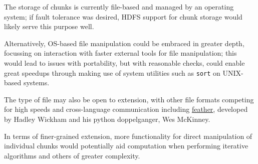 \documentclass[10pt,a4paper]{article}
\begin{document}
The storage of chunks is currently file-based and managed by an
operating system; if fault tolerance was desired, HDFS support for
chunk storage would likely serve this purpose well.

Alternatively, OS-based file manipulation could be embraced in greater
depth, focussing on interaction with faster external tools for file
manipulation; this would lead to issues with portability, but with
reasonable checks, could enable great speedups through making use of
system utilities such as \texttt{sort} on UNIX-based systems.

The type of file may also be open to extension, with other file
formats competing for high speeds and cross-language communication
including \href{https://github.com/wesm/feather}{feather}, developed
by Hadley Wickham and his python doppelganger, Wes
McKinney\cite{wes16}.


In terms of finer-grained extension, more functionality for direct
manipulation of individual chunks would potentially aid computation
when performing iterative algorithms and others of greater complexity.


\printbibliography{}
\end{document}
